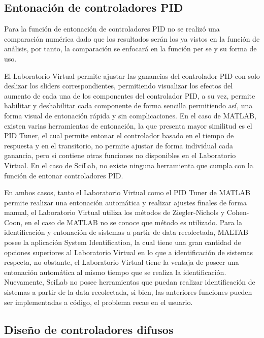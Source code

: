     \subsection{Entonación de controladores PID}
        
        Para la función de entonación de controladores PID no se realizó una comparación numérica dado que los resultados serán los ya vistos en la función de análisis, por tanto, la comparación se enfocará en la función per se y su forma de uso.

        El Laboratorio Virtual permite ajustar las ganancias del controlador PID con solo deslizar los sliders correspondientes, permitiendo visualizar los efectos del aumento de cada una de los componentes del controlador PID, a su vez, permite habilitar y deshabilitar cada componente de forma sencilla permitiendo así, una forma visual de entonación rápida y sin complicaciones. En el caso de MATLAB, existen varias herramientas de entonación, la que presenta mayor similitud es el PID Tuner, el cual permite entonar el controlador basado en el tiempo de respuesta y en el transitorio, no permite ajustar de forma individual cada ganancia, pero si contiene otras funciones no disponibles en el Laboratorio Virtual. En el caso de SciLab, no existe ninguna herramienta que cumpla con la función de entonar controladores PID.

        En ambos casos, tanto el Laboratorio Virtual como el PID Tuner de MATLAB permite realizar una entonación automática y realizar ajustes finales de forma manual, el Laboratorio Virtual utiliza los métodos de Ziegler-Nichols y Cohen-Coon, en el caso de MATLAB no se conoce que método es utilizado. Para la identificación y entonación de sistemas a partir de data recolectada, MALTAB posee la aplicación System Identification, la cual tiene una gran cantidad de opciones superiores al Laboratorio Virtual en lo que a identificación de sistemas respecta, no obstante, el Laboratorio Virtual tiene la ventaja de poseer una entonación automática al mismo tiempo que se realiza la identificación. Nuevamente, SciLab no posee herramientas que puedan realizar identificación de sistemas a partir de la data recolectada, si bien, las anteriores funciones pueden ser implementadas a código, el problema recae en el usuario.

    \subsection{Diseño de controladores difusos}

